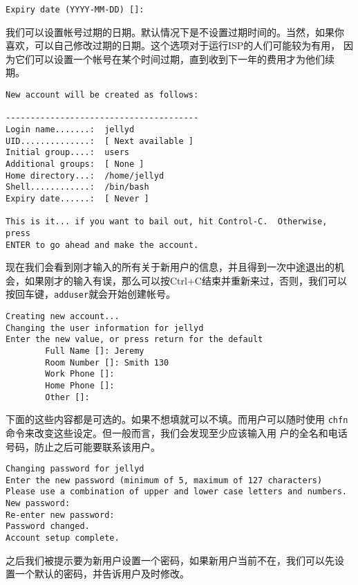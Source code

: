 \begin{Verbatim}[frame=single, commandchars=\\\{\}]
Expiry date (YYYY-MM-DD) []:
\end{Verbatim}

我们可以设置帐号过期的日期。默认情况下是不设置过期时间的。当然，如果你
喜欢，可以自己修改过期的日期。这个选项对于运行ISP的人们可能较为有用，
因为它们可以设置一个帐号在某个时间过期，直到收到下一年的费用才为他们续
期。

\begin{Verbatim}[frame=single, commandchars=\\\{\}]
New account will be created as follows:

---------------------------------------
Login name.......:  jellyd
UID..............:  [ Next available ]
Initial group....:  users
Additional groups:  [ None ]
Home directory...:  /home/jellyd
Shell............:  /bin/bash
Expiry date......:  [ Never ]

This is it... if you want to bail out, hit Control-C.  Otherwise, press
ENTER to go ahead and make the account.
\end{Verbatim}

现在我们会看到刚才输入的所有关于新用户的信息，并且得到一次中途退出的机
会，如果刚才的输入有误，那么可以按Ctrl+C结束并重新来过，否则，我们可以
按回车键，\texttt{adduser}就会开始创建帐号。
\begin{Verbatim}[frame=single, commandchars=\\\{\}]
Creating new account...
Changing the user information for jellyd
Enter the new value, or press return for the default
        Full Name []: Jeremy
        Room Number []: Smith 130
        Work Phone []:
        Home Phone []:
        Other []:
\end{Verbatim}
下面的这些内容都是可选的。如果不想填就可以不填。而用户可以随时使用
\texttt{chfn}命令来改变这些设定。但一般而言，我们会发现至少应该输入用
户的全名和电话号码，防止之后可能要联系该用户。

\begin{Verbatim}[frame=single, commandchars=\\\{\}]
Changing password for jellyd
Enter the new password (minimum of 5, maximum of 127 characters)
Please use a combination of upper and lower case letters and numbers.
New password:
Re-enter new password:
Password changed.
Account setup complete.
\end{Verbatim}

之后我们被提示要为新用户设置一个密码，如果新用户当前不在，我们可以先设
置一个默认的密码，并告诉用户及时修改。

